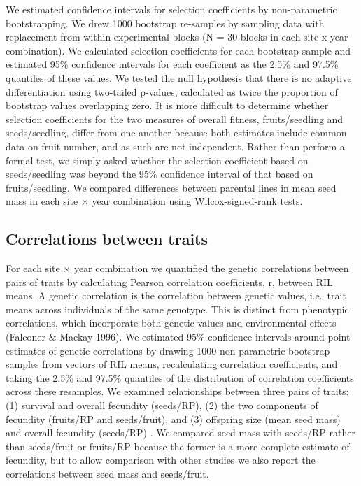 \documentclass[
]{article}
\begin{document}
We estimated confidence intervals for selection coefficients by non-parametric bootstrapping. We drew 1000 bootstrap re-samples by sampling data with replacement from within experimental blocks (N = 30 blocks in each site x year combination). We calculated selection coefficients for each bootstrap sample and estimated 95\% confidence intervals for each coefficient as the 2.5\% and 97.5\% quantiles of these values. We tested the null hypothesis that there is no adaptive differentiation using two-tailed p-values, calculated as twice the proportion of bootstrap values overlapping zero. It is more difficult to determine whether selection coefficients for the two measures of overall fitness, fruits/seedling and seeds/seedling, differ from one another because both estimates include common data on fruit number, and as such are not independent. Rather than perform a formal test, we simply asked whether the selection coefficient based on seeds/seedling was beyond the 95\% confidence interval of that based on fruits/seedling. We compared differences between parental lines in mean seed mass in each site × year combination using Wilcox-signed-rank tests.

\hypertarget{correlations-between-traits}{%
\subsection{Correlations between traits}\label{correlations-between-traits}}

For each site × year combination we quantified the genetic correlations between pairs of traits by calculating Pearson correlation coefficients, r, between RIL means. A genetic correlation is the correlation between genetic values, i.e.~trait means across individuals of the same genotype. This is distinct from phenotypic correlations, which incorporate both genetic values and environmental effects (Falconer \& Mackay 1996). We estimated 95\% confidence intervals around point estimates of genetic correlations by drawing 1000 non-parametric bootstrap samples from vectors of RIL means, recalculating correlation coefficients, and taking the 2.5\% and 97.5\% quantiles of the distribution of correlation coefficients across these resamples. We examined relationships between three pairs of traits: (1) survival and overall fecundity (seeds/RP), (2) the two components of fecundity (fruits/RP and seeds/fruit), and (3) offspring size (mean seed mass) and overall fecundity (seeds/RP) . We compared seed mass with seeds/RP rather than seeds/fruit or fruits/RP because the former is a more complete estimate of fecundity, but to allow comparison with other studies we also report the correlations between seed mass and seeds/fruit.
\end{document}
